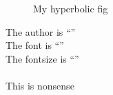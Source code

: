 \begin{figure}
	\centering
	
	\caption{My hyperbolic fig}
	\label{fig:my-hyperbole}
\end{figure}

The author is ``\mehauthor''\\
The font is ``\mehfont''\\
The fontsize is ``\mehfontsize''\\


\\
This is nonsense\\




